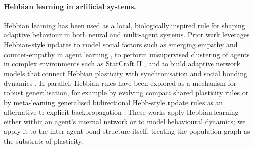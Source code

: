 \paragraph{Hebbian learning in artificial systems.} Hebbian learning has been used as a local, biologically inspired rule for shaping adaptive behaviour in both neural and multi-agent systems. Prior work leverages Hebbian-style updates to model social factors such as emerging empathy and counter-empathy in agent learning \cite{chen2019reaching}, to perform unsupervised clustering of agents in complex environments such as StarCraft II \cite{kang2023forecasting}, and to build adaptive network models that connect Hebbian plasticity with synchronisation and social bonding dynamics \cite{mukeriia2024multi}. In parallel, Hebbian rules have been explored as a mechanism for robust generalisation, for example by evolving compact shared plasticity rules \cite{pedersen2021evolving} or by meta-learning generalised bidirectional Hebb-style update rules as an alternative to explicit backpropagation \cite{sandler2021meta}. These works apply Hebbian learning either within an agent's internal network or to model behavioural dynamics; we apply it to the inter-agent bond structure itself, treating the population graph as the substrate of plasticity.

